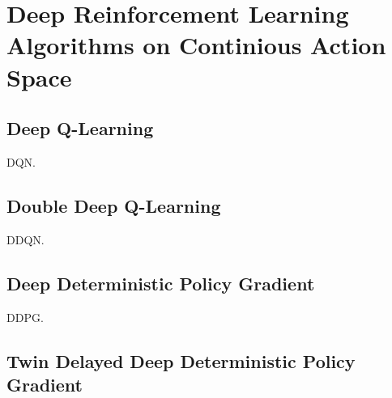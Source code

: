 \section{Deep Reinforcement Learning Algorithms on Continious Action Space}

\subsection{Deep Q-Learning}
\label{sec:dqn}
DQN.

\subsection{Double Deep Q-Learning}
\label{sec:ddqn}
DDQN.

\subsection{Deep Deterministic Policy Gradient}
\label{sec:ddpg}
DDPG.

\subsection{Twin Delayed Deep Deterministic Policy Gradient}
\label{sec:td3}

